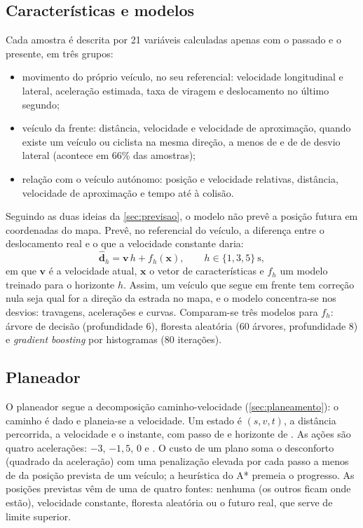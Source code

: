 \subsection{Características e modelos}

Cada amostra é descrita por 21 variáveis calculadas apenas com o passado e
o presente, em três grupos:
\begin{itemize}
  \item movimento do próprio veículo, no seu referencial: velocidade
    longitudinal e lateral, aceleração estimada, taxa de viragem e
    deslocamento no último segundo;
  \item veículo da frente: distância, velocidade e velocidade de
    aproximação, quando existe um veículo ou ciclista na mesma direção, a
    menos de  e de  de desvio lateral (acontece em
    66\% das amostras);
  \item relação com o veículo autónomo: posição e velocidade relativas,
    distância, velocidade de aproximação e tempo até à colisão.
\end{itemize}

Seguindo as duas ideias da \cref{sec:previsao}, o modelo não prevê a
posição futura em coordenadas do mapa. Prevê, no referencial do veículo,
a diferença entre o deslocamento real e o que a velocidade constante
daria:
\begin{equation}
  \hat{\mathbf{d}}_h = \mathbf{v}\,h + f_h(\mathbf{x}),
  \qquad h \in \{1, 3, 5\}~\mathrm{s},
\end{equation}
em que $\mathbf{v}$ é a velocidade atual, $\mathbf{x}$ o vetor de
características e $f_h$ um modelo treinado para o horizonte $h$. Assim, um
veículo que segue em frente tem correção nula seja qual for a direção da
estrada no mapa, e o modelo concentra-se nos desvios: travagens,
acelerações e curvas. Comparam-se três modelos para $f_h$: árvore de
decisão (profundidade 6), floresta aleatória (60 árvores, profundidade 8)
e \emph{gradient boosting} por histogramas (80 iterações).

\subsection{Planeador}

O planeador segue a decomposição caminho-velocidade
(\cref{sec:planeamento}): o caminho é dado e planeia-se a velocidade. Um
estado é $(s, v, t)$, a distância percorrida, a velocidade e o instante,
com passo de  e horizonte de . As ações são quatro
acelerações: $-3$, $-1,5$, $0$ e . O custo de um plano
soma o desconforto (quadrado da aceleração) com uma penalização elevada
por cada passo a menos de  da posição prevista de um veículo; a
heurística do A* premeia o progresso. As posições previstas vêm de uma de
quatro fontes: nenhuma (os outros ficam onde estão), velocidade constante,
floresta aleatória ou o futuro real, que serve de limite superior.
